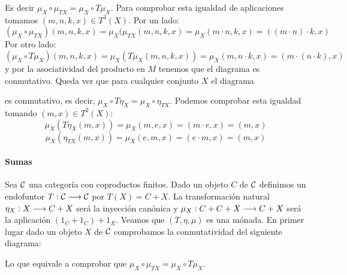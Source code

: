 \begin{center}
\end{center}
Es decir $\mu_X \circ \mu_{TX} = \mu_X \circ T\mu_X$. Para comprobar
esta igualdad de aplicaciones tomamos $(m, n, k, x) \in T^3(X)$.
Por un lado:
$$(\mu_X \circ \mu_{TX})(m, n, k, x) = \mu_X(\mu_{TX}(m, n, k, x)
  = \mu_X(m\cdot n, k, x) = ((m\cdot n)\cdot k, x)$$
Por otro lado:
$$(\mu_X \circ T\mu_X)(m, n, k, x) = \mu_X(T\mu_X(m, n, k, x))
  = \mu_X(m, n\cdot k, x) = (m \cdot (n\cdot k), x)$$
y por la asociatividad del producto en $M$ tenemos que
el diagrama es conmutativo.
Queda ver que para cualquier conjunto $X$ el diagrama
\begin{center}
\end{center}
es conmutativo, es decir, $\mu_X \circ T\eta_X = \mu_X \circ \eta_{TX}$. Podemos
comprobar esta igualdad tomando $(m, x) \in T^2(X)$:
$$\mu_X(T\eta_X(m, x)) = \mu_X(m, e, x) = (m \cdot e, x) = (m, x)$$
$$\mu_X(\eta_{TX}(m, x)) = \mu_X(e, m, x) = (e\cdot m, x) = (m, x)$$

\paragraph{Sumas}
Sea $\mathcal{C}$ una categoría con coproductos finitos. Dado un objeto
$C$ de $\mathcal{C}$ definimos
un endofuntor $T : \mathcal{C}\longrightarrow \mathcal{C}$ por $T(X) = C + X$. La
transformación natural $\eta_X : X\longrightarrow C + X$ será
la inyección canónica y $\mu_X : C + C + X\longrightarrow C+X$ será
la aplicación $(1_C + 1_C) + 1_X$. Veamos que
$(T, \eta, \mu)$ es una mónada. En primer lugar
dado un objeto $X$ de $\mathcal{C}$ comprobamos la conmutatividad
del siguiente diagrama:
\begin{center}
\end{center}
Lo que equivale a comprobar que
$\mu_X \circ \mu_{TX} = \mu_X \circ T\mu_X$.

